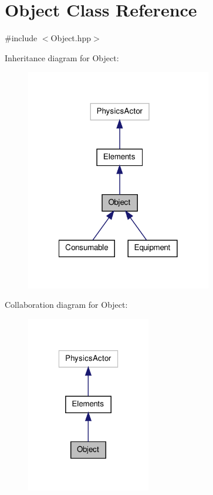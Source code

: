\hypertarget{class_object}{\section{Object Class Reference}
\label{class_object}
}


{\ttfamily \#include $<$Object.\-hpp$>$}



Inheritance diagram for Object\-:\nopagebreak
\begin{figure}[H]
\begin{center}
\leavevmode
\includegraphics[width=230pt]{class_object__inherit__graph}
\end{center}
\end{figure}


Collaboration diagram for Object\-:\nopagebreak
\begin{figure}[H]
\begin{center}
\leavevmode
\includegraphics[width=154pt]{class_object__coll__graph}
\end{center}
\end{figure}
